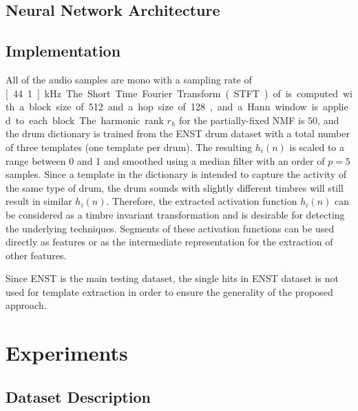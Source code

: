\documentclass{article}
\begin{document}
\subsection{Neural Network Architecture}





\subsection{Implementation}
All of the audio samples are mono with a sampling rate of \unit[44.1]{kHz}. The Short Time Fourier Transform (STFT) of is computed with a block size of 512 and a hop size of 128, and a Hann window is applied to each block. The harmonic rank $r_{h} $ for the partially-fixed NMF is  $50$, and the drum dictionary is trained from the ENST drum dataset \cite{Gillet2006} with a total number of three templates (one template per drum). The resulting $h_{i}(n)$ is scaled to a range between 0 and 1 and smoothed using a median filter with an order of $p = 5$ samples. Since a template in the dictionary is intended to capture the activity of the same type of drum, the drum sounds with slightly different timbres will still result in similar $h_{i}(n)$. Therefore, the extracted activation function $h_{i}(n)$ can be considered as a timbre invariant transformation and is desirable for detecting the underlying techniques. Segments of these activation functions can be used directly as features or as the intermediate representation for the extraction of other features. 

Since ENST is the main testing dataset, the single hits in ENST dataset is not used for template extraction in order to ensure the generality of the proposed approach.

\section{Experiments}\label{sec:experiments}

\subsection{Dataset Description}
\end{document}
